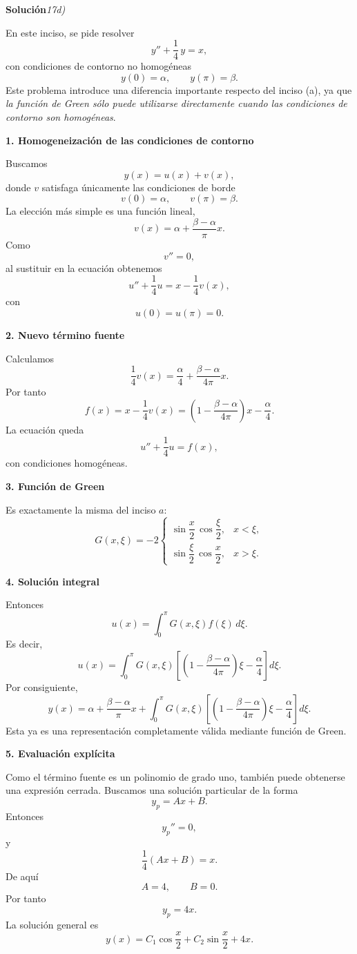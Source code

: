 \documentclass[11pt,spanish]{article}
\newcounter{problema}
\begin{document}
\vspace{0.5cm}
{\bf Soluci\'on}{\em 17d)}
\vspace{0.5cm}

En este inciso, se pide resolver
$$
y''+\frac14\,y=x,
$$
con condiciones de contorno no homogéneas
$$
y(0)=\alpha,
\qquad
y(\pi)=\beta.
$$
Este problema introduce una diferencia importante respecto del inciso (a), ya que {\em la función de Green sólo puede utilizarse directamente cuando las condiciones de contorno son homogéneas}.

{\bf 1. Homogeneización de las condiciones de contorno}

Buscamos
$$
y(x)=u(x)+v(x),
$$
donde $v$ satisfaga únicamente las condiciones de borde
$$
v(0)=\alpha,
\qquad
v(\pi)=\beta.
$$
La elección más simple es una función lineal,
$$
v(x)
=
\alpha
+
\frac{\beta-\alpha}{\pi}x.
$$
Como
$$
v''=0,
$$
al sustituir en la ecuación obtenemos
$$
u''+\frac14u
=
x-\frac14v(x),
$$
con
$$
u(0)=u(\pi)=0.
$$

{\bf 2. Nuevo término fuente}

Calculamos
$$
\frac14v (x)
=
\frac{\alpha}{4}
+
\frac{\beta-\alpha}{4\pi}x.
$$
Por tanto
$$
f(x)
=
x-\frac14 v(x)
=
\left(
1-\frac{\beta-\alpha}{4\pi}
\right)x
-
\frac{\alpha}{4}.
$$
La ecuación queda
$$
u''+\frac14u=f(x),
$$
con condiciones homogéneas.

{\bf 3. Función de Green}

Es exactamente la misma del inciso $a$:
$$
\boxed{
G(x,\xi)
=
-2
\begin{cases}
\sin\dfrac{x}{2}\,
\cos\dfrac{\xi}{2},
&
x<\xi,\\
\sin\dfrac{\xi}{2}\,
\cos\dfrac{x}{2},
&
x>\xi.
\end{cases}
}
$$

{\bf 4. Solución integral}

Entonces
$$
u(x)
=
\int_0^\pi
G(x,\xi)
f(\xi)\,d\xi.
$$
Es decir,
$$
\boxed{
u(x)
=
\int_0^\pi
G(x,\xi)
\left[
\left(
1-\frac{\beta-\alpha}{4\pi}
\right)\xi
-\frac{\alpha}{4}
\right]
d\xi.
}
$$
Por consiguiente,
$$
\boxed{
y(x)
=
\alpha
+
\frac{\beta-\alpha}{\pi}x
+
\int_0^\pi
G(x,\xi)
\left[
\left(
1-\frac{\beta-\alpha}{4\pi}
\right)\xi
-\frac{\alpha}{4}
\right]
d\xi.
}
$$
Esta ya es una representación completamente válida mediante función de Green.

{\bf 5. Evaluación explícita}

Como el término fuente es un polinomio de grado uno, también puede obtenerse una expresión cerrada.
Buscamos una solución particular de la forma
$$
y_p=Ax+B.
$$
Entonces
$$
y_p''=0,
$$
y
$$
\frac14(Ax+B)=x.
$$
De aquí
$$
A=4,
\qquad
B=0.
$$
Por tanto
$$
y_p=4x.
$$
La solución general es
$$
y(x)
=
C_1\cos\frac{x}{2}
+
C_2\sin\frac{x}{2}
+
4x.
$$
\end{document}
